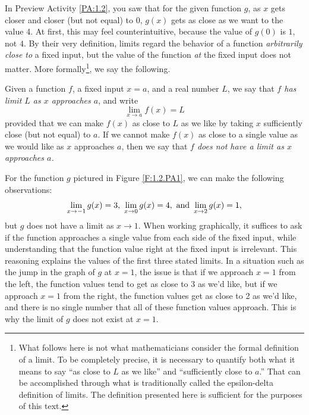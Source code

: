 In Preview Activity \ref{PA:1.2}, you saw that for the given function $g$, as $x$ gets closer and closer (but not equal) to 0, $g(x)$ gets as close as we want to the value 4.  At first, this may feel counterintuitive, because the value of $g(0)$ is $1$, not $4$.  By their very definition, limits regard the behavior of a function \emph{arbitrarily close to} a fixed input, but the value of the function \emph{at} the fixed input does not matter.  More formally\footnote{What follows here is not what mathematicians consider the formal definition of a limit.  To be completely precise, it is necessary to quantify both what it means to say ``as close to $L$ as we like'' and ``sufficiently close to $a$.''  That can be accomplished through what is traditionally called the epsilon-delta definition of limits.  The definition presented here is sufficient for the purposes of this text.}, we say the following.

\begin{definition}
Given a function $f$, a fixed input $x = a$, and a real number $L$, we say that \emph{$f$ has limit $L$ as $x$ approaches $a$}, and write
$$\lim_{x \to a} f(x) = L$$
provided that we can make $f(x)$ as close to $L$ as we like by taking $x$ sufficiently close (but not equal) to $a$.  If we cannot make $f(x)$ as close to a single value as we would like as $x$ approaches $a$, then we say that \emph{$f$ does not have a limit as $x$ approaches $a$.}
\end{definition}
For the function $g$ pictured in Figure \ref{F:1.2.PA1}, we can make the following observations:  
$$\displaystyle \lim_{x \to -1} g(x) = 3, \ \displaystyle \lim_{x \to 0} g(x) = 4, \ \mbox{and} \ \displaystyle \lim_{x \to 2} g(x) = 1,$$ but $g$ does not have a limit as $x \to 1$.  When working graphically, it suffices to ask if the function approaches a single value from each side of the fixed input, while understanding that the function value right at the fixed input is irrelevant.  This reasoning explains the values of the first three stated limits.  In a situation such as the jump in the graph of $g$ at $x = 1$, the issue is that if we approach $x = 1$ from the left, the function values tend to get as close to 3 as we'd like, but if we approach $x = 1$ from the right, the function values get as close to 2 as we'd like, and there is no single number that all of these function values approach.  This is why the limit of $g$ does not exist at $x = 1$.

